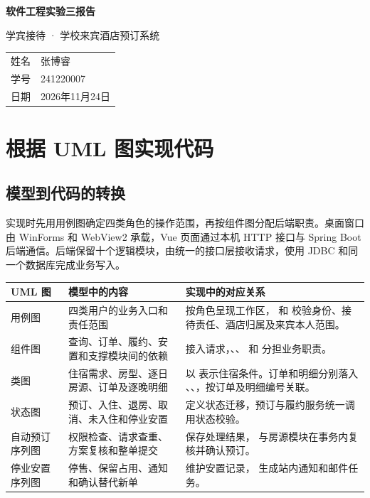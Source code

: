 \documentclass[UTF8,zihao=-4,fontset=windows]{ctexart}
\begin{document}
\thispagestyle{empty}
\vspace*{31mm}
\begin{center}
  {\color{reportnavy}\bfseries 软件工程实验三报告\par}
  \vspace{6mm}
  {\color{reportgray}学宾接待 · 学校来宾酒店预订系统\par}
  \vspace{15mm}
  \begin{tabular}{@{}r@{\qquad}l@{}}
    姓名 & 张博睿 \\
    学号 & 241220007 \\
    日期 & 2026年11月24日 \\
  \end{tabular}
\end{center}
\vspace{15mm}

\tableofcontents

\clearpage

\section{根据 UML 图实现代码}
\subsection{模型到代码的转换}

实现时先用用例图确定四类角色的操作范围，再按组件图分配后端职责。桌面窗口由 WinForms 和 WebView2 承载，Vue 页面通过本机 HTTP 接口与 Spring Boot 后端通信。后端保留十个逻辑模块，由统一的接口层接收请求，使用 JDBC 和同一个数据库完成业务写入。

{\small
\noindent\begin{tabularx}{\linewidth}{@{}p{25mm}p{57mm}Y@{}}
\toprule
\textbf{UML 图} & \textbf{模型中的内容} & \textbf{实现中的对应关系} \\
\midrule
用例图 & 四类用户的业务入口和责任范围 &
 按角色呈现工作区， 和  校验身份、接待责任、酒店归属及来宾本人范围。 \\
组件图 & 查询、订单、履约、安置和支撑模块间的依赖 &
 接入请求，、、 和  分担业务职责。 \\
类图 & 住宿需求、房型、逐日房源、订单及逐晚明细 &
以  表示住宿条件。订单和明细分别落入 、、，按订单及明细编号关联。 \\
状态图 & 预订、入住、退房、取消、未入住和停业安置 &
 定义状态迁移，预订与履约服务统一调用状态校验。 \\
自动预订序列图 & 权限检查、请求查重、方案复核和整单提交 &
 保存处理结果， 与房源模块在事务内复核并确认预订。 \\
停业安置序列图 & 停售、保留占用、通知和确认替代新单 &
 维护安置记录， 生成站内通知和邮件任务。 \\
\bottomrule
\end{tabularx}\par
}
\end{document}

